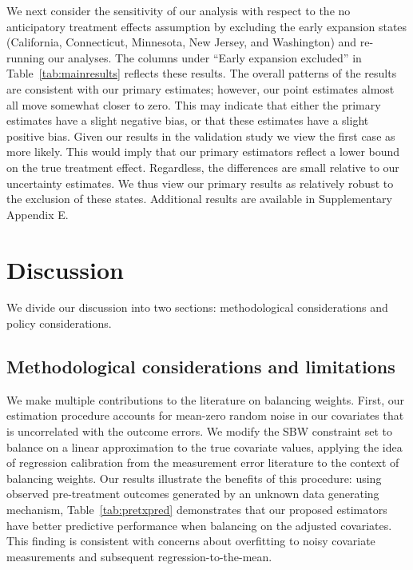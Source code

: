 \documentclass[aoas]{imsart}
\theoremstyle{plain}
\theoremstyle{remark}
\begin{document}
We next consider the sensitivity of our analysis with respect to the no anticipatory treatment effects assumption by excluding the early expansion states (California, Connecticut, Minnesota, New Jersey, and Washington) and re-running our analyses. The columns under ``Early expansion excluded'' in Table~\ref{tab:mainresults} reflects these results. The overall patterns of the results are consistent with our primary estimates; however, our point estimates almost all move somewhat closer to zero. This may indicate that either the primary estimates have a slight negative bias, or that these estimates have a slight positive bias. Given our results in the validation study we view the first case as more likely. This would imply that our primary estimators reflect a lower bound on the true treatment effect. Regardless, the differences are small relative to our uncertainty estimates. We thus view our primary results as relatively robust to the exclusion of these states. Additional results are available in Supplementary Appendix E.

\section{Discussion}

We divide our discussion into two sections: methodological considerations and policy considerations. 

\subsection{Methodological considerations and limitations}

We make multiple contributions to the literature on balancing weights. First, our estimation procedure accounts for mean-zero random noise in our covariates that is uncorrelated with the outcome errors. We modify the SBW constraint set to balance on a linear approximation to the true covariate values, applying the idea of regression calibration from the measurement error literature to the context of balancing weights. Our results illustrate the benefits of this procedure: using observed pre-treatment outcomes generated by an unknown data generating mechanism, Table~\ref{tab:pretxpred} demonstrates that our proposed estimators have better predictive performance when balancing on the adjusted covariates. This finding is consistent with concerns about overfitting to noisy covariate measurements and subsequent regression-to-the-mean.
\end{document}
